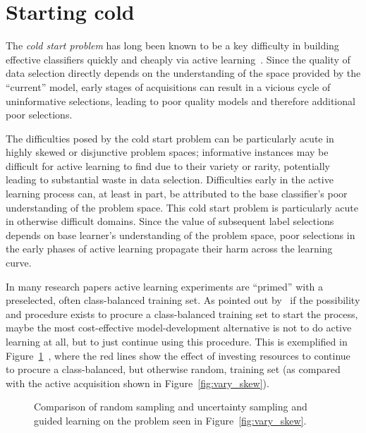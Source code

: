 \section{Starting cold}
\label{sec:cold}

The \emph{cold start problem} has long been known to be a key difficulty in building effective classifiers quickly and cheaply via active learning~\cite{zhuDensity2008, donmez07dual}. Since the quality of data
selection directly depends on the understanding of the space provided by the ``current'' model, early stages of acquisitions can result in a vicious cycle of uninformative selections, leading to poor quality models and therefore additional poor selections.

The difficulties posed by the cold start problem can be particularly acute in highly skewed or disjunctive problem spaces; informative instances may be difficult for active learning to find due to their variety or rarity, potentially leading to substantial waste in data selection.
Difficulties early in the active learning process can, at least in part, be attributed to the base classifier's poor understanding of the problem space. This cold start problem is particularly acute in otherwise difficult domains. Since the value of subsequent label selections depends on base learner's understanding of the problem space, poor selections in the early phases of active learning propagate their harm across the learning curve.

In many research papers active learning experiments are ``primed'' with a preselected, often class-balanced training set.  As pointed out by~\cite{attprovkdd2010} if the possibility and procedure exists to procure a class-balanced training set to start the process, maybe the most cost-effective model-development alternative is not to do active learning at all, but to just continue using this procedure. This is exemplified in Figure~\ref{fig:guidedvary_skew}~\cite{attprovkdd2010},
where the red lines show the effect of investing resources to continue to procure a class-balanced, but otherwise random,
training set (as compared
with the active acquisition shown in Figure~\ref{fig:vary_skew}).

\begin{figure}[t!]
\caption{Comparison of random sampling and uncertainty sampling and guided learning on the problem seen in Figure~\ref{fig:vary_skew}.}
\label{fig:guidedvary_skew}
\end{figure}

